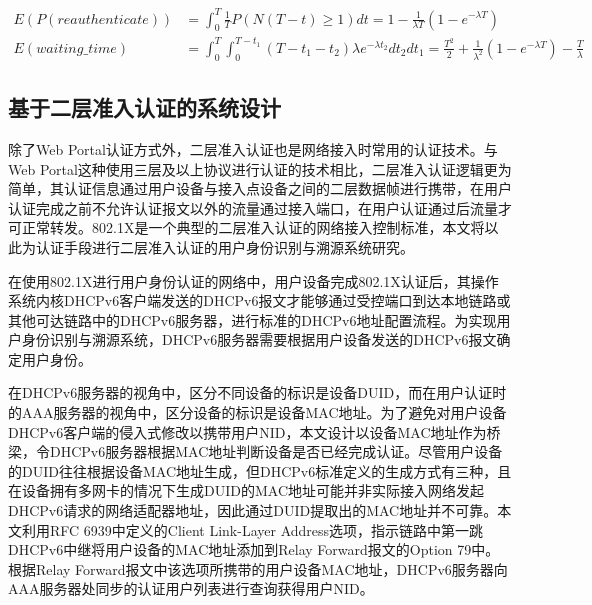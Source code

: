     \begin{subequations}
      \begin{align}
        E(P(reauthenticate)) &= \int_{0}^{T}{\frac{1}{T}P(N(T - t) \geq 1)dt}=1-\frac{1}{\lambda T}(1 - e^{-\lambda T}) \label{eq:reauthenticate_probability} \\
        E(waiting\_time) &= \int_{0}^{T}{\int_{0}^{T-t_{1}}{(T-t_{1}-t_{2})\lambda e^{-\lambda t_{2}}dt_{2}}dt_{1}} = \frac{T^2}{2}+\frac{1}{\lambda^{2}}(1-e^{-\lambda T})-\frac{T}{\lambda} \label{eq:reauthenticate_time}
      \end{align}
    \end{subequations}

    \subsection{基于二层准入认证的系统设计}
    \label{NIDTGA:DHCPv6:8021X}
    除了Web Portal认证方式外，二层准入认证也是网络接入时常用的认证技术。与Web Portal这种使用三层及以上协议进行认证的技术相比，二层准入认证逻辑更为简单，其认证信息通过用户设备与接入点设备之间的二层数据帧进行携带，在用户认证完成之前不允许认证报文以外的流量通过接入端口，在用户认证通过后流量才可正常转发。802.1X\cite{ieee802ieee}是一个典型的二层准入认证的网络接入控制标准，本文将以此为认证手段进行二层准入认证的用户身份识别与溯源系统研究。
    
    在使用802.1X进行用户身份认证的网络中，用户设备完成802.1X认证后，其操作系统内核DHCPv6客户端发送的DHCPv6报文才能够通过受控端口到达本地链路或其他可达链路中的DHCPv6服务器，进行标准的DHCPv6地址配置流程。为实现用户身份识别与溯源系统，DHCPv6服务器需要根据用户设备发送的DHCPv6报文确定用户身份。

    在DHCPv6服务器的视角中，区分不同设备的标识是设备DUID，而在用户认证时的AAA服务器的视角中，区分设备的标识是设备MAC地址。为了避免对用户设备DHCPv6客户端的侵入式修改以携带用户NID，本文设计以设备MAC地址作为桥梁，令DHCPv6服务器根据MAC地址判断设备是否已经完成认证。尽管用户设备的DUID往往根据设备MAC地址生成，但DHCPv6标准定义的生成方式有三种，且在设备拥有多网卡的情况下生成DUID的MAC地址可能并非实际接入网络发起DHCPv6请求的网络适配器地址，因此通过DUID提取出的MAC地址并不可靠。本文利用RFC 6939\cite{RFC6939}中定义的Client Link-Layer Address选项，指示链路中第一跳DHCPv6中继将用户设备的MAC地址添加到Relay Forward报文的Option 79中。根据Relay Forward报文中该选项所携带的用户设备MAC地址，DHCPv6服务器向AAA服务器处同步的认证用户列表进行查询获得用户NID。

